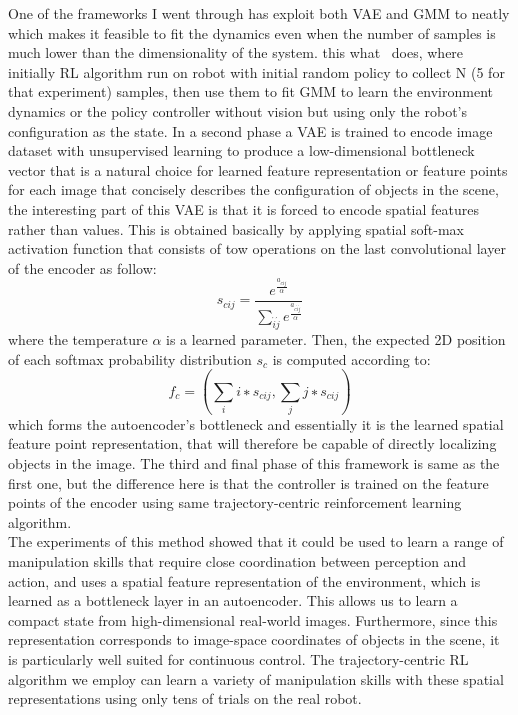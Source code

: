 One of the frameworks I went through has exploit both VAE and GMM to neatly which makes it feasible to fit the dynamics
even when the number of samples is much lower than the
dimensionality of the system. this what~\cite{finn2016deep} does, where initially RL algorithm run on robot with initial random policy to collect N (5 for that experiment) samples, then use them to fit GMM to learn the environment dynamics  or the policy controller without vision but using only the robot’s configuration as the state. In a second phase a VAE is trained to encode image dataset with unsupervised learning to produce a low-dimensional bottleneck vector that is a natural choice for learned feature representation or feature points for each image that concisely describes the configuration of objects in the scene, the interesting part of this VAE is that it is forced to encode spatial features rather than values. This is obtained  basically by applying spatial soft-max activation function that consists of tow operations on the last convolutional layer of the encoder as follow:
\begin{equation}
s_{cij} = \frac {e^{\frac{a_{cij}}{\alpha}}}
{\sum_{\acute{i}\acute{j}} e^{ \frac {a_{c \acute{i} \acute{j}}}{\alpha}}}
\end{equation}
where the temperature $\alpha$ is a learned parameter. Then, the expected
2D position of each softmax probability distribution $s_c$ is
computed according to:
\begin{equation}
f_c = (\sum_i i ∗ s_{cij} , \sum_j j ∗ s_{cij} )
\end{equation}
which forms the autoencoder's bottleneck and essentially it is the learned spatial feature point representation, that will therefore be capable of directly localizing objects in the image. The third and final phase of this framework is same as the first one, but the difference here is that the controller is trained on the feature points of the encoder using same trajectory-centric reinforcement
learning algorithm.\\
The experiments of this method showed that it could be used to learn a range of manipulation skills that require close coordination between perception and
action, and uses a spatial feature representation of the environment, which is learned as a bottleneck layer in
an autoencoder. This allows us to learn a compact state from high-dimensional real-world images. Furthermore, since this
representation corresponds to image-space coordinates of objects in the scene, it is particularly well suited for continuous control. The trajectory-centric RL algorithm we employ can learn a variety of manipulation skills with these spatial
representations using only tens of trials on the real robot.

\clearpage{\pagestyle{empty}\cleardoublepage}